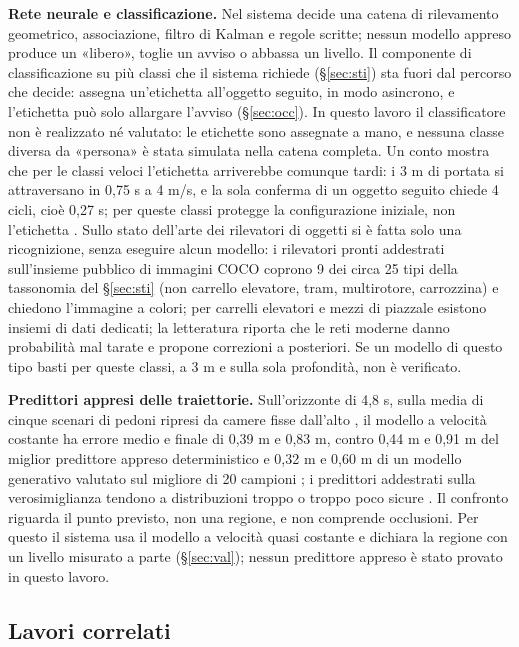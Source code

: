 \textbf{Rete neurale e classificazione.} Nel sistema decide una catena di rilevamento geometrico, associazione, filtro di Kalman e regole scritte; nessun modello appreso produce un «libero», toglie un avviso o abbassa un livello. Il componente di classificazione su più classi che il sistema richiede (\S\ref{sec:sti}) sta fuori dal percorso che decide: assegna un'etichetta all'oggetto seguito, in modo asincrono, e l'etichetta può solo allargare l'avviso (\S\ref{sec:occ}). In questo lavoro il classificatore non è realizzato né valutato: le etichette sono assegnate a mano, e nessuna classe diversa da «persona» è stata simulata nella catena completa. Un conto mostra che per le classi veloci l'etichetta arriverebbe comunque tardi: i 3 m di portata si attraversano in 0,75 s a 4 m/s, e la sola conferma di un oggetto seguito chiede 4 cicli, cioè 0,27 s; per queste classi protegge la configurazione iniziale, non l'etichetta . Sullo stato dell'arte dei rilevatori di oggetti si è fatta solo una ricognizione, senza eseguire alcun modello: i rilevatori pronti addestrati sull'insieme pubblico di immagini COCO coprono 9 dei circa 25 tipi della tassonomia del \S\ref{sec:sti} (non carrello elevatore, tram, multirotore, carrozzina) e chiedono l'immagine a colori; per carrelli elevatori e mezzi di piazzale esistono insiemi di dati dedicati; la letteratura riporta che le reti moderne danno probabilità mal tarate e propone correzioni a posteriori. Se un modello di questo tipo basti per queste classi, a 3 m e sulla sola profondità, non è verificato. 

\textbf{Predittori appresi delle traiettorie.} Sull'orizzonte di 4,8 s, sulla media di cinque scenari di pedoni ripresi da camere fisse dall'alto \cite{pellegrini2009,lerner2007}, il modello a velocità costante ha errore medio e finale di 0,39 m e 0,83 m, contro 0,44 m e 0,91 m del miglior predittore appreso deterministico e 0,32 m e 0,60 m di un modello generativo valutato sul migliore di 20 campioni \cite{scholler2020}; i predittori addestrati sulla verosimiglianza tendono a distribuzioni troppo o troppo poco sicure \cite{cheraghipouria2026}. Il confronto riguarda il punto previsto, non una regione, e non comprende occlusioni. Per questo il sistema usa il modello a velocità quasi costante e dichiara la regione con un livello misurato a parte (\S\ref{sec:val}); nessun predittore appreso è stato provato in questo lavoro.

\subsection{Lavori correlati}\label{sec:cos-correlati}

